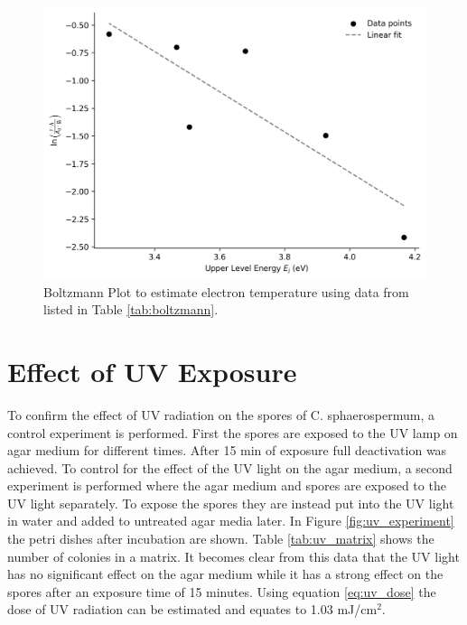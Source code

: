 \begin{figure}
    \centering
    \includegraphics[width=.85\textwidth]{images/boltzmann_plot.png}
    \caption[Boltzmann Plot to estimate electron temperature]{Boltzmann Plot to estimate electron temperature using data from \cite{coefficients} listed in Table \ref{tab:boltzmann}.}
    \label{fig:boltzmann}
\end{figure}

\section{Effect of UV Exposure}
To confirm the effect of UV radiation on the spores of C. sphaerospermum, a control experiment is performed. First the spores are exposed to the UV lamp on agar medium for different times. After 15 min of exposure full deactivation was achieved. To control for the effect of the UV light on the agar medium, a second experiment is performed where the agar medium and spores are exposed to the UV light separately. To expose the spores they are instead put into the UV light in water and added to untreated agar media later. In Figure \ref{fig:uv_experiment} the petri dishes after incubation are shown. Table \ref{tab:uv_matrix} shows the number of colonies in a matrix. It becomes clear from this data that the UV light has no significant effect on the agar medium while it has a strong effect on the spores after an exposure time of 15 minutes. Using equation \ref{eq:uv_dose} the dose of UV radiation can be estimated and equates to 1.03 mJ/cm$^2$.

